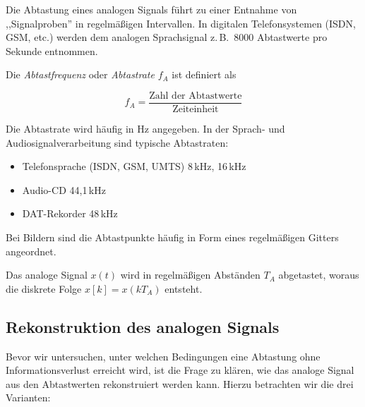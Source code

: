 Die Abtastung eines analogen Signals führt zu einer Entnahme von ,,Signalproben'' in regelmäßigen Intervallen. In digitalen Telefonsystemen (ISDN, GSM, etc.) werden dem analogen Sprachsignal z.\,B.\ 8000 Abtastwerte pro Sekunde entnommen.

\begin{definition}[Abtastrate]
Die \textit{Abtastfrequenz} oder \textit{Abtastrate} $f_A$ ist definiert als

$$
f_A = \frac{\text{Zahl der Abtastwerte}}{\text{Zeiteinheit}}
$$
\end{definition}

Die Abtastrate wird häufig in Hz angegeben. In der Sprach- und Audiosignalverarbeitung sind typische Abtastraten:
\begin{itemize}
  \item Telefonsprache (ISDN, GSM, UMTS) \hfill 8\,kHz, 16\,kHz
  \item Audio-CD \hfill 44{,}1\,kHz
  \item DAT-Rekorder \hfill 48\,kHz
\end{itemize}

Bei Bildern sind die Abtastpunkte häufig in Form eines regelmäßigen Gitters angeordnet.

\begin{beispiel}
Das analoge Signal $x(t)$ wird in regelmäßigen Abständen $T_A$ abgetastet, woraus die diskrete Folge $x[k] = x(kT_A)$ entsteht.

\end{beispiel}

\subsection*{Rekonstruktion des analogen Signals}

Bevor wir untersuchen, unter welchen Bedingungen eine Abtastung ohne Informationsverlust erreicht wird, ist die Frage zu klären, wie das analoge Signal aus den Abtastwerten rekonstruiert werden kann. Hierzu betrachten wir die drei Varianten:

